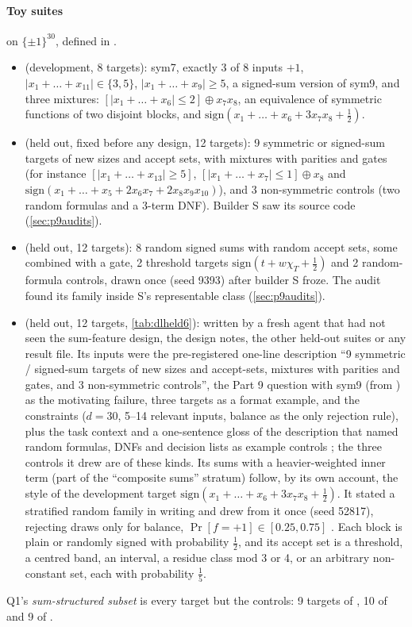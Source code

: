 \paragraph{Toy suites} on $\{\pm1\}^{30}$, defined in .
\begin{itemize}
\item {} (development, 8 targets): sym7, exactly 3 of 8 inputs $+1$, $|x_1+\dots+x_{11}|\in\{3,5\}$, $|x_1+\dots+x_9|\ge5$, a signed-sum version of sym9, and three mixtures: $[|x_1+\dots+x_6|\le2]\oplus x_7x_8$, an equivalence of symmetric functions of two disjoint blocks, and $\mathrm{sign}(x_1+\dots+x_6+3x_7x_8+\tfrac12)$.
\item {} (held out, fixed before any design, 12 targets): 9 symmetric or signed-sum targets of new sizes and accept sets, with mixtures with parities and gates (for instance $[|x_1+\dots+x_{13}|\ge5]$, $[|x_1+\dots+x_7|\le1]\oplus x_8$ and $\mathrm{sign}(x_1+\dots+x_5+2x_6x_7+2x_8x_9x_{10})$), and 3 non-symmetric controls (two random formulas and a 3-term DNF). Builder S saw its source code (\cref{sec:p9audits}).
\item {} (held out, 12 targets): 8 random signed sums with random accept sets, some combined with a gate, 2 threshold targets $\mathrm{sign}(t+w\chi_T+\tfrac12)$ and 2 random-formula controls, drawn once (seed 9393) after builder S froze. The audit found its family inside S's representable class (\cref{sec:p9audits}).
\item {} (held out, 12 targets, \cref{tab:dlheld6}): written by a fresh agent that had not seen the sum-feature design, the design notes, the other held-out suites or any result file. Its inputs were the pre-registered one-line description ``9 symmetric / signed-sum targets of new sizes and accept-sets, mixtures with parities and gates, and 3 non-symmetric controls'', the Part 9 question with sym9 (from ) as the motivating failure, three  targets as a format example, and the constraints ($d=30$, 5--14 relevant inputs, balance as the only rejection rule), plus the task context and a one-sentence gloss of the description that named random formulas, DNFs and decision lists as example controls ; the three controls it drew are of these kinds. Its sums with a heavier-weighted inner term (part of the ``composite sums'' stratum) follow, by its own account, the style of the development target $\mathrm{sign}(x_1+\dots+x_6+3x_7x_8+\tfrac12)$. It stated a stratified random family in writing and drew from it once (seed 52817), rejecting draws only for balance, $\Pr[f=+1]\in[0.25,0.75]$ . Each block is plain or randomly signed with probability $\tfrac12$, and its accept set is a threshold, a centred band, an interval, a residue class mod 3 or 4, or an arbitrary non-constant set, each with probability $\tfrac15$.
\end{itemize}
Q1's \emph{sum-structured subset} is every target but the controls: 9 targets of , 10 of  and 9 of .

